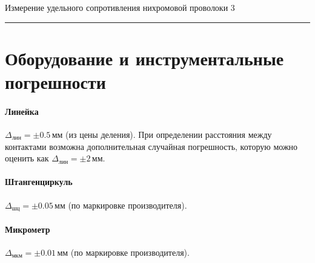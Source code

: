 \documentclass[12pt,a4paper]{scrartcl}
\begin{document}
	\newpage
	\begin{flushleft}
		\footnotesize{Измерение удельного сопротивления нихромовой проволоки} \hspace{\fill} \footnotesize{3}
		\\[-0.3cm]\noindent\rule{\textwidth}{0.3pt}
	\end{flushleft}
	

	\section{Оборудование и инструментальные погрешности}
	
	\paragraph{Линейка} \hfill
	
	\par $\Delta_{\text{лин}} = \pm0.5\,$мм (из цены деления). При определении расстояния между контактами возможна дополнительная случайная погрешность, которую можно оценить как $\Delta_{\text{лин}} = \pm2\,$мм.
	
	\paragraph{Штангенциркуль} \hfill
	
	\par $\Delta_{\text{шц}} = \pm 0.05\,$мм (по маркировке производителя).
	
	\paragraph{Микрометр} \hfill
	
	\par $\Delta_{\text{мкм}} = \pm 0.01\,$мм (по маркировке производителя).
	
\end{document}
